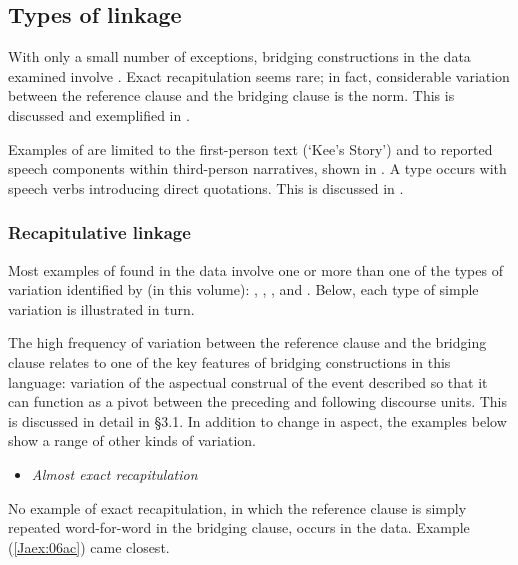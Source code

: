 \documentclass[output=paper]{LSP/langsci}
\begin{document}
\subsection{Types of linkage}
\label{Jatypes}
With only a small number of exceptions, bridging constructions in the  data examined involve . Exact recapitulation seems rare; in fact, considerable variation between the reference clause and the bridging clause is the norm. This is discussed and exemplified in . 
 
Examples of  are limited to the first-person text (`Kee’s Story') and to reported speech components within third-person narratives, shown in . A  type occurs with speech verbs introducing direct quotations. This is discussed in .
 
\subsubsection{Recapitulative linkage}
\label{JaRecapitulative}
Most examples of  found in the data involve one or more than one of the types of variation identified by \citeauthor{guerin18} (in this volume): , , , and . Below, each type of simple variation is illustrated in turn.
 
The high frequency of variation between the reference clause and the bridging clause relates to one of the key features of bridging constructions in this language: variation of the aspectual construal of the event described so that it can function as a pivot between the preceding and following discourse units. This is discussed in detail in §3.1. In addition to change in aspect, the examples below show a range of other kinds of variation.
 

\begin{itemize}
\item \textit{Almost exact recapitulation}
\end{itemize}

No example of exact recapitulation, in which the reference clause is simply repeated word-for-word in the bridging clause, occurs in the data. Example (\ref{Jaex:06ac}) came closest.
\end{document}
